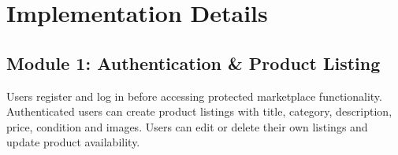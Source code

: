 \documentclass[12pt,a4paper,oneside]{report}
\begin{document}

\section{Implementation Details}

\subsection{Module 1: Authentication \& Product Listing}

Users register and log in before accessing protected marketplace
functionality. Authenticated users can create product listings with
title, category, description, price, condition and images. Users can
edit or delete their own listings and update product availability.

\end{document}
